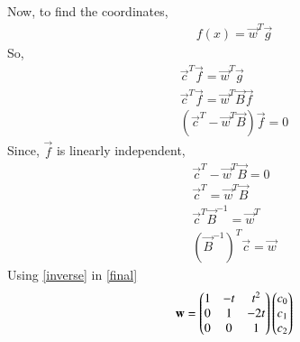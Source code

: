 \documentclass[journal,12pt,twocolumn]{IEEEtran}
\begin{document}
   Now, to find the coordinates,
  \begin{align}
  f(x)=\vec{w}^T\vec{g}
  \end{align}
  So,
  \begin{align}
  \vec{c}^T\vec{f}=\vec{w}^T\vec{g}\\
\vec{c}^T\vec{f}=\vec{w}^T\vec{B}\vec{f}\\
(\vec{c}^T-\vec{w}^T\vec{B})\vec{f}=0
  \end{align} 
  Since, $\vec{f}$ is linearly independent,
  \begin{align}
  \vec{c}^T-\vec{w}^T\vec{B}=0\\
  \vec{c}^T=\vec{w}^T\vec{B}\\
  \vec{c}^T\vec{B}^{-1}=\vec{w}^T\\
   (\vec{B}^{-1})^T\vec{c}=\vec{w}\label{final}\end{align}
   Using \eqref{inverse} in \eqref{final}
   \begin{align}
 \mathbf{w}= \begin{pmatrix}1&-t&t^2\\0&1&-2t\\0&0&1\end{pmatrix}\begin{pmatrix}c_0\\c_1\\c_2\end{pmatrix}
  \end{align} 
\end{document}
